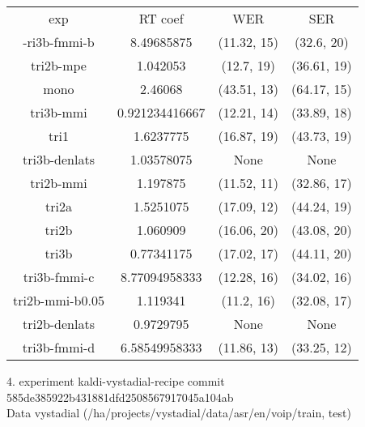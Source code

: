 \begin{tabular}{cccc}
exp             & RT coef        & WER         & SER        \\
-ri3b-fmmi-b    & 8.49685875     & (11.32, 15) & (32.6, 20) \\
tri2b-mpe       & 1.042053       & (12.7, 19)  & (36.61, 19)\\
mono            & 2.46068        & (43.51, 13) & (64.17, 15)\\
tri3b-mmi       & 0.921234416667 & (12.21, 14) & (33.89, 18)\\
tri1            & 1.6237775      & (16.87, 19) & (43.73, 19)\\
tri3b-denlats   & 1.03578075     & None        & None       \\
tri2b-mmi       & 1.197875       & (11.52, 11) & (32.86, 17)\\
tri2a           & 1.5251075      & (17.09, 12) & (44.24, 19)\\
tri2b           & 1.060909       & (16.06, 20) & (43.08, 20)\\
tri3b           & 0.77341175     & (17.02, 17) & (44.11, 20)\\
tri3b-fmmi-c    & 8.77094958333  & (12.28, 16) & (34.02, 16)\\
tri2b-mmi-b0.05 & 1.119341       & (11.2, 16)  & (32.08, 17)\\
tri2b-denlats   & 0.9729795      & None        & None       \\
tri3b-fmmi-d    & 6.58549958333  & (11.86, 13) & (33.25, 12)
\end{tabular}


4. experiment kaldi-vystadial-recipe commit 585de385922b431881dfd2508567917045a104ab\\
Data vystadial (/ha/projects/vystadial/data/asr/en/voip/{train, test})

